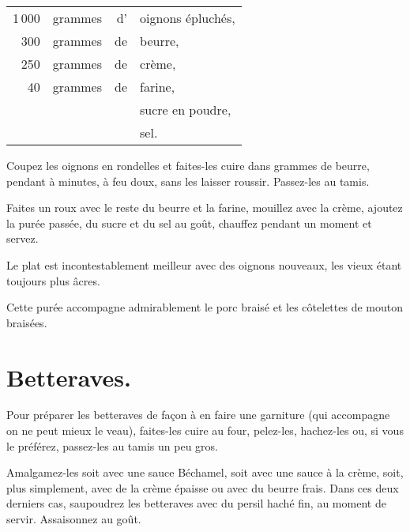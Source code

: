 \footnotesize
\begin{longtable}{rrrp{16em}}
  1 000 & grammes & d' & oignons épluchés,                                                                \\
    300 & grammes & de & beurre,                                                                          \\
    250 & grammes & de & crème,                                                                           \\
     40 & grammes & de & farine,                                                                          \\
        &         &    & sucre en poudre,                                                                 \\
        &         &    & sel.                                                                             \\
\end{longtable}
\normalsize

Coupez les oignons en rondelles et faites-les cuire dans {\mmm} grammes
de beurre, pendant {\mmm} à {\mmm} minutes, à feu doux, sans les
laisser roussir. Passez-les au tamis.

Faites un roux avec le reste du beurre et la farine, mouillez avec la crème,
ajoutez la purée passée, du sucre et du sel au goût, chauffez pendant un moment
et servez.

Le plat est incontestablement meilleur avec des oignons nouveaux, les vieux
étant toujours plus âcres.

\medskip

Cette purée accompagne admirablement le porc braisé et les côtelettes de
mouton braisées.

\section*{\centering Betteraves.}
{}
\label{pg0780} \hypertarget{p0780}{}

Pour préparer les betteraves de façon à en faire une garniture (qui accompagne
on ne peut mieux le veau), faites-les cuire au four, pelez-les, hachez-les ou,
si vous le préférez, passez-les au tamis un peu gros.

Amalgamez-les soit avec une sauce Béchamel, soit avec une sauce à la crème,
soit, plus simplement, avec de la crème épaisse ou avec du beurre frais. Dans
ces deux derniers cas, saupoudrez les betteraves avec du persil haché fin, au
moment de servir. Assaisonnez au goût.


